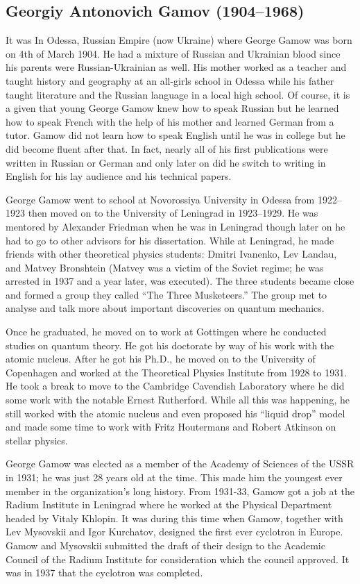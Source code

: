 \subsection[George \scshape{Gamow}]{Georgiy Antonovich Gamov (1904--1968)}\label{bio:gamow}
It was In Odessa, Russian Empire (now Ukraine) where George Gamow was born on 4th of March 1904. He had a mixture of Russian and Ukrainian blood since his parents were Russian-Ukrainian as well. His mother worked as a teacher and taught history and geography at an all-girls school in Odessa while his father taught literature and the Russian language in a local high school. Of course, it is a given that young George Gamow knew how to speak Russian but he learned how to speak French with the help of his mother and learned German from a tutor. Gamow did not learn how to speak English until he was in college but he did become fluent after that. In fact, nearly all of his first publications were written in Russian or German and only later on did he switch to writing in English for his lay audience and his technical papers.

George Gamow went to school at Novorossiya University in Odessa from 1922--1923 then moved on to the University of Leningrad in 1923--1929. He was mentored by Alexander Friedman when he was in Leningrad though later on he had to go to other advisors for his dissertation. While at Leningrad, he made friends with other theoretical physics students: Dmitri Ivanenko, Lev Landau, and Matvey Bronshtein (Matvey was a victim of the Soviet regime; he was arrested in 1937 and a year later, was executed). The three students became close and formed a group they called “The Three Musketeers.” The group met to analyse and talk more about important discoveries on quantum mechanics.

Once he graduated, he moved on to work at Gottingen where he conducted studies on quantum theory. He got his doctorate by way of his work with the atomic nucleus. After he got his Ph.D., he moved on to the University of Copenhagen and worked at the Theoretical Physics Institute from 1928 to 1931. He took a break to move to the Cambridge Cavendish Laboratory where he did some work with the notable Ernest Rutherford. While all this was happening, he still worked with the atomic nucleus and even proposed his “liquid drop” model and made some time to work with Fritz Houtermans and Robert Atkinson on stellar physics.

George Gamow was elected as a member of the Academy of Sciences of the USSR in 1931; he was just 28 years old at the time. This made him the youngest ever member in the organization’s long history. From 1931-33, Gamow got a job at the Radium Institute in Leningrad where he worked at the Physical Department headed by Vitaly Khlopin. It was during this time when Gamow, together with Lev Mysovskii and Igor Kurchatov, designed the first ever cyclotron in Europe. Gamow and Mysovskii submitted the draft of their design to the Academic Council of the Radium Institute for consideration which the council approved. It was in 1937 that the cyclotron was completed.

